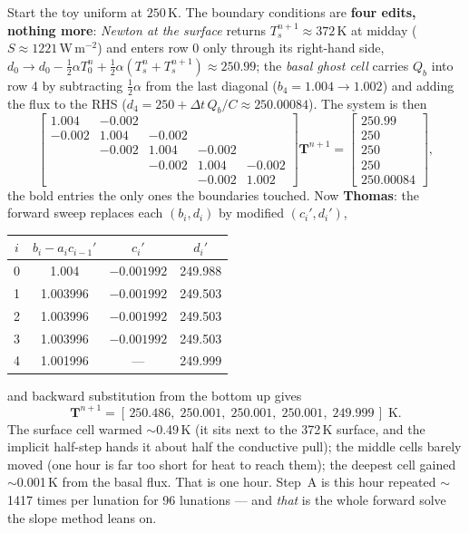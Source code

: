 \documentclass[11pt]{report}
\begin{document}
\noindent Start the toy uniform at $250$\,K. The boundary conditions are \textbf{four edits, nothing
more}: \emph{Newton at the surface} returns $T_s^{n+1}\approx372$\,K at midday
($S\approx1221$\,W\,m$^{-2}$) and enters row 0 only through its right-hand side,
$d_0\to d_0-\tfrac12\alpha T_0^n+\tfrac12\alpha(T_s^n+T_s^{n+1})\approx250.99$;
the \emph{basal ghost cell} carries $Q_b$ into row 4 by subtracting
$\tfrac12\alpha$ from the last diagonal ($b_4=1.004\to1.002$) and adding the flux
to the RHS ($d_4=250+\Delta t\,Q_b/C\approx250.00084$). The system is then
\[
\begin{bmatrix}
1.004 & -0.002 & & & \\
-0.002 & 1.004 & -0.002 & & \\
 & -0.002 & 1.004 & -0.002 & \\
 & & -0.002 & 1.004 & -0.002 \\
 & & & -0.002 & \mathbf{1.002}
\end{bmatrix}\mathbf{T}^{n+1}=
\begin{bmatrix}\mathbf{250.99}\\250\\250\\250\\\mathbf{250.00084}\end{bmatrix},
\]
the bold entries the only ones the boundaries touched. Now \textbf{Thomas}: the
forward sweep replaces each $(b_i,d_i)$ by modified $(c_i',d_i')$,
\begin{center}\small
\begin{tabular}{@{}cccc@{}}
\toprule
$i$ & $b_i-a_ic_{i-1}'$ & $c_i'$ & $d_i'$ \\
\midrule
0 & 1.004    & $-0.001992$ & 249.988 \\
1 & 1.003996 & $-0.001992$ & 249.503 \\
2 & 1.003996 & $-0.001992$ & 249.503 \\
3 & 1.003996 & $-0.001992$ & 249.503 \\
4 & 1.001996 & ---         & 249.999 \\
\bottomrule
\end{tabular}
\end{center}
and backward substitution from the bottom up gives
\[
\mathbf{T}^{n+1}=[\,250.486,\;250.001,\;250.001,\;250.001,\;249.999\,]\;\text{K}.
\]
The surface cell warmed $\sim$0.49\,K (it sits next to the 372\,K surface, and the
implicit half-step hands it about half the conductive pull); the middle cells
barely moved (one hour is far too short for heat to reach them); the deepest cell
gained $\sim$0.001\,K from the basal flux. That is one hour. Step~A is this hour
repeated $\sim$1417 times per lunation for 96 lunations --- and \emph{that} is
the whole forward solve the slope method leans on.
\end{document}
